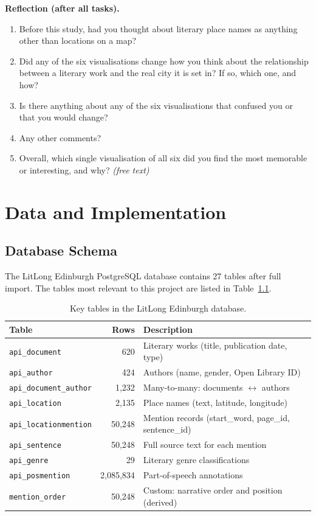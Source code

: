 \documentclass[logo,msc]{infthesis}
\begin{document}
\textbf{Reflection (after all tasks).}
\begin{enumerate}
  \item Before this study, had you thought about literary place names as anything other than locations on a map?
  \item Did any of the six visualisations change how you think about the relationship between a literary work and the real city it is set in? If so, which one, and how?
  \item Is there anything about any of the six visualisations that confused you or that you would change?
  \item Any other comments?
  \item Overall, which single visualisation of all six did you find the most memorable or interesting, and why? \emph{(free text)}
\end{enumerate}
 
\chapter{Data and Implementation}
 
\section{Database Schema}
 
The LitLong Edinburgh PostgreSQL database contains 27 tables after full import. The tables most relevant to this project are listed in Table~\ref{tab:db-schema}.
 
\begin{table}[h]
\centering
\caption{Key tables in the LitLong Edinburgh database.}
\label{tab:db-schema}
\small
\begin{tabular}{lrl}
\toprule
Table & Rows & Description \\
\midrule
\texttt{api\_document} & 620 & Literary works (title, publication date, type) \\
\texttt{api\_author} & 424 & Authors (name, gender, Open Library ID) \\
\texttt{api\_document\_author} & 1,232 & Many-to-many: documents $\leftrightarrow$ authors \\
\texttt{api\_location} & 2,135 & Place names (text, latitude, longitude) \\
\texttt{api\_locationmention} & 50,248 & Mention records (start\_word, page\_id, sentence\_id) \\
\texttt{api\_sentence} & 50,248 & Full source text for each mention \\
\texttt{api\_genre} & 29 & Literary genre classifications \\
\texttt{api\_posmention} & 2,085,834 & Part-of-speech annotations \\
\texttt{mention\_order} & 50,248 & Custom: narrative order and position (derived) \\
\bottomrule
\end{tabular}
\end{table}
 
\end{document}
